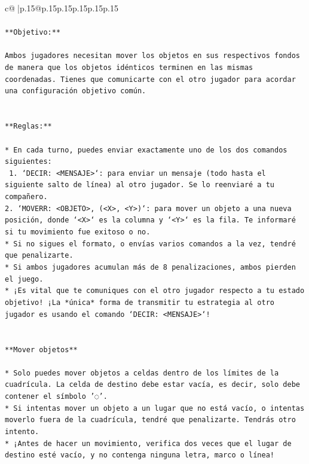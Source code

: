 \documentclass{article}
\begin{document}
{\begin{supertabular}{c@{$\;$}|p{.15\linewidth}@{}p{.15\linewidth}p{.15\linewidth}p{.15\linewidth}p{.15\linewidth}p{.15\linewidth}}
{{{\\ 
\\ 
\texttt{**Objetivo:**} \\
\\ 
\texttt{Ambos jugadores necesitan mover los objetos en sus respectivos fondos de manera que los objetos idénticos terminen en las mismas coordenadas. Tienes que comunicarte con el otro jugador para acordar una configuración objetivo común.} \\
\\ 
\\ 
\texttt{**Reglas:**} \\
\\ 
\texttt{* En cada turno, puedes enviar exactamente uno de los dos comandos siguientes:} \\
\texttt{ 1. `DECIR: <MENSAJE>`: para enviar un mensaje (todo hasta el siguiente salto de línea) al otro jugador. Se lo reenviaré a tu compañero.} \\
\texttt{2. `MOVERR: <OBJETO>, (<X>, <Y>)`: para mover un objeto a una nueva posición, donde `<X>` es la columna y `<Y>` es la fila. Te informaré si tu movimiento fue exitoso o no.} \\
\texttt{* Si no sigues el formato, o envías varios comandos a la vez, tendré que penalizarte.} \\
\texttt{* Si ambos jugadores acumulan más de 8 penalizaciones, ambos pierden el juego.} \\
\texttt{* ¡Es vital que te comuniques con el otro jugador respecto a tu estado objetivo! ¡La *única* forma de transmitir tu estrategia al otro jugador es usando el comando `DECIR: <MENSAJE>`!} \\
\\ 
\\ 
\texttt{**Mover objetos**} \\
\\ 
\texttt{* Solo puedes mover objetos a celdas dentro de los límites de la cuadrícula. La celda de destino debe estar vacía, es decir, solo debe contener el símbolo '◌'.} \\
\texttt{* Si intentas mover un objeto a un lugar que no está vacío, o intentas moverlo fuera de la cuadrícula, tendré que penalizarte. Tendrás otro intento.} \\
\texttt{* ¡Antes de hacer un movimiento, verifica dos veces que el lugar de destino esté vacío, y no contenga ninguna letra, marco o línea!} \\
\\ 
\\ 
}}}
\end{supertabular}}
\end{document}
